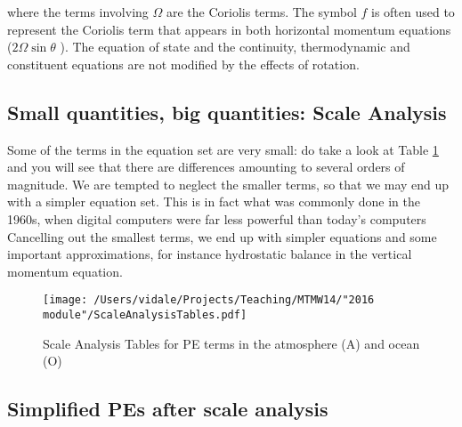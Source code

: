 where the terms involving $\Omega$ are the Coriolis terms. The symbol $f$ is often used to represent the Coriolis term that appears in both horizontal momentum equations ($2 \Omega \sin \theta$ ). The equation of state and the continuity, thermodynamic and constituent equations are not modified by the effects of rotation.




\subsection{Small quantities, big quantities: Scale Analysis}

Some of the terms in the equation set are very small: do take a look at Table \ref{fig:Scale-Analysis-Tables} and you will see that there are differences amounting to several orders of magnitude. We are tempted to neglect the smaller terms, so that we may end up with a simpler equation set. This is in fact what  was commonly done  in the 1960s, when digital computers were far less powerful than today's computers
Cancelling out the smallest terms, we end up with simpler equations and some important approximations, for instance hydrostatic balance in the vertical momentum equation.

\begin{figure}[h!]
		\begin{center}
	\texttt{[image: /Users/vidale/Projects/Teaching/MTMW14/"2016 module"/ScaleAnalysisTables.pdf]}
		\end{center}
	\caption{\label{fig:blue_rectangle} Scale Analysis Tables for PE terms in the atmosphere (A) and ocean (O)}
		\label{fig:Scale-Analysis-Tables}
\end{figure}

\subsection{Simplified PEs after scale analysis}

